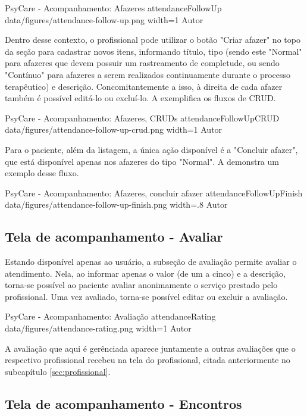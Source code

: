 \image
    {PsyCare - Acompanhamento: Afazeres}
    {attendanceFollowUp}
    {data/figures/attendance-follow-up.png}
    {width=1\textwidth}
    {Autor}

Dentro desse contexto, o profissional pode utilizar o botão "Criar afazer" no topo da seção para cadastrar novos itens, informando título, tipo (sendo este "Normal" para afazeres que devem possuir um rastreamento de completude, ou sendo "Contínuo" para afazeres a serem realizados continuamente durante o processo terapêutico) e descrição. Concomitantemente a isso, à direita de cada afazer também é possível editá-lo ou excluí-lo. A  exemplifica os fluxos de CRUD.

\image
    {PsyCare - Acompanhamento: Afazeres, CRUDs}
    {attendanceFollowUpCRUD}
    {data/figures/attendance-follow-up-crud.png}
    {width=1\textwidth}
    {Autor}

Para o paciente, além da listagem, a única ação disponível é a "Concluir afazer", que está disponível apenas nos afazeres do tipo "Normal". A  demonstra um exemplo desse fluxo.

\image
    {PsyCare - Acompanhamento: Afazeres, concluir afazer}
    {attendanceFollowUpFinish}
    {data/figures/attendance-follow-up-finish.png}
    {width=.8\textwidth}
    {Autor}

\subsection{Tela de acompanhamento - Avaliar}
\label{sec:acompanhamentoAvaliar}

Estando disponível apenas ao usuário, a subseção de avaliação permite avaliar o atendimento. Nela, ao informar apenas o valor (de um a cinco) e a descrição, torna-se possível ao paciente avaliar anonimamente o serviço prestado pelo profissional. Uma vez avaliado, torna-se possível editar ou excluir a avaliação.

\image
    {PsyCare - Acompanhamento: Avaliação}
    {attendanceRating}
    {data/figures/attendance-rating.png}
    {width=1\textwidth}
    {Autor}

A avaliação que aqui é gerênciada aparece juntamente a outras avaliações que o respectivo profissional recebeu na tela do profissional, citada anteriormente no subcapítulo \ref{sec:profissional}.

\subsection{Tela de acompanhamento - Encontros}
\label{sec:acompanhamentoEncontros}


